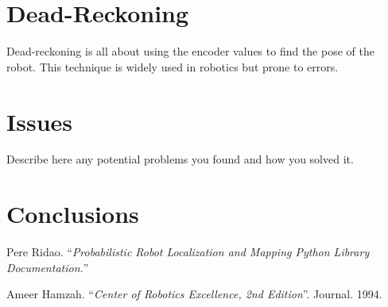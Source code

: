 \documentclass{article}
\begin{document}
\section{Dead-Reckoning}
Dead-reckoning is all about using the encoder values to find the pose of the robot. This technique is widely used in robotics but prone to errors.

\section{Issues}
Describe here any potential problems you found and how you solved it.

\section{Conclusions}


\begin{thebibliography}{3}
    Pere Ridao. ``\textit{Probabilistic Robot Localization and Mapping Python Library Documentation.}''
    
    Ameer Hamzah. ``\textit{Center of Robotics Excellence, 2nd Edition}''. Journal. 1994.


\end{thebibliography}
\end{document}
